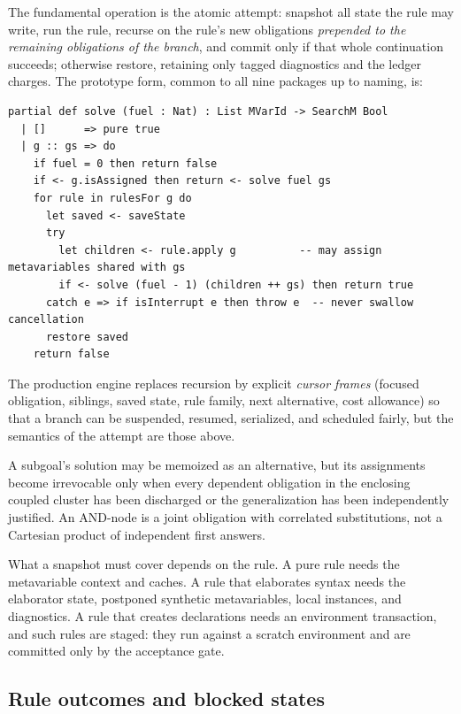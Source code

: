 The fundamental operation is the atomic attempt: snapshot all state the rule may write, run the rule, recurse on the rule's new obligations \emph{prepended to the remaining obligations of the branch}, and commit only if that whole continuation succeeds; otherwise restore, retaining only tagged diagnostics and the ledger charges. The prototype form, common to all nine packages up to naming, is:

\begin{lstlisting}
partial def solve (fuel : Nat) : List MVarId -> SearchM Bool
  | []      => pure true
  | g :: gs => do
    if fuel = 0 then return false
    if <- g.isAssigned then return <- solve fuel gs
    for rule in rulesFor g do
      let saved <- saveState
      try
        let children <- rule.apply g          -- may assign metavariables shared with gs
        if <- solve (fuel - 1) (children ++ gs) then return true
      catch e => if isInterrupt e then throw e  -- never swallow cancellation
      restore saved
    return false
\end{lstlisting}

The production engine replaces recursion by explicit \emph{cursor frames} (focused obligation, siblings, saved state, rule family, next alternative, cost allowance) so that a branch can be suspended, resumed, serialized, and scheduled fairly, but the semantics of the attempt are those above.

\begin{invariant}\label{inv:commit}
A subgoal's solution may be memoized as an alternative, but its assignments become irrevocable only when every dependent obligation in the enclosing coupled cluster has been discharged or the generalization has been independently justified. An AND-node is a joint obligation with correlated substitutions, not a Cartesian product of independent first answers.
\end{invariant}

What a snapshot must cover depends on the rule. A pure  rule needs the metavariable context and caches. A rule that elaborates syntax needs the elaborator state, postponed synthetic metavariables, local instances, and diagnostics. A rule that creates declarations needs an environment transaction, and such rules are staged: they run against a scratch environment and are committed only by the acceptance gate.

\subsection{Rule outcomes and blocked states}

